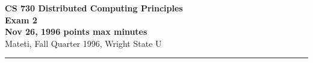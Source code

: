\def\fat{\framebox[1mm]{\rule{0mm}{2mm}}}
\def\CSP{{\sc csp}}
\def\RPC{{\sc rpc}}
\def\SR{{\sc sr}}
\def\co{{\bf co}}
\def\oc{{\bf oc}}
\def\pa{{$\parallel$}}
\def\lb{\langle}
\def\rb{\rangle}
\def\ra{$\rightarrow$}
\def\await{{\bf await}}
\def\zimplies{\Rightarrow}
%
\topmargin 0pt
\oddsidemargin 17pt \evensidemargin 17pt
\textheight 8.3in %
\textwidth 6.0in

\parindent=0pt
\pagestyle{empty}



{\bf CS 
\large \bf 730 Distributed Computing Principles\\[5pt]
\large Exam 2\\[10pt]
Nov 26, 1996  points max  minutes\\
}
\bigskip
{Mateti,  Fall Quarter 1996, Wright State U}\\[-5pt]
\hrule

